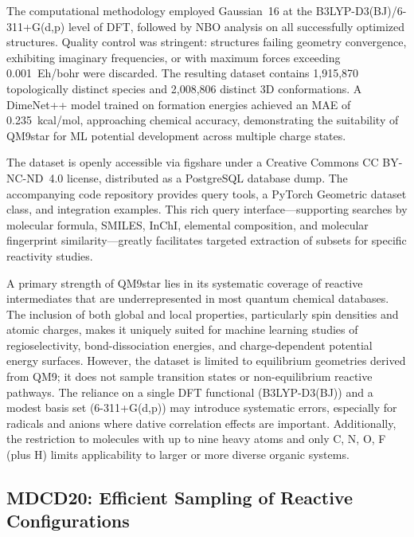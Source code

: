 \documentclass[12pt]{article}
\begin{document}
The computational methodology employed Gaussian~16 at the B3LYP-D3(BJ)/6-311+G(d,p) level of DFT, followed by NBO analysis on all successfully optimized structures. Quality control was stringent: structures failing geometry convergence, exhibiting imaginary frequencies, or with maximum forces exceeding 0.001~Eh/bohr were discarded. The resulting dataset contains 1,915,870 topologically distinct species and 2,008,806 distinct 3D conformations. A DimeNet++ model trained on formation energies achieved an MAE of 0.235~kcal/mol, approaching chemical accuracy, demonstrating the suitability of QM9star for ML potential development across multiple charge states.

The dataset is openly accessible via figshare under a Creative Commons CC BY-NC-ND~4.0 license, distributed as a PostgreSQL database dump. The accompanying code repository provides query tools, a PyTorch Geometric dataset class, and integration examples. This rich query interface---supporting searches by molecular formula, SMILES, InChI, elemental composition, and molecular fingerprint similarity---greatly facilitates targeted extraction of subsets for specific reactivity studies.

A primary strength of QM9star lies in its systematic coverage of reactive intermediates that are underrepresented in most quantum chemical databases. The inclusion of both global and local properties, particularly spin densities and atomic charges, makes it uniquely suited for machine learning studies of regioselectivity, bond-dissociation energies, and charge-dependent potential energy surfaces. However, the dataset is limited to equilibrium geometries derived from QM9; it does not sample transition states or non-equilibrium reactive pathways. The reliance on a single DFT functional (B3LYP-D3(BJ)) and a modest basis set (6-311+G(d,p)) may introduce systematic errors, especially for radicals and anions where dative correlation effects are important. Additionally, the restriction to molecules with up to nine heavy atoms and only C, N, O, F (plus H) limits applicability to larger or more diverse organic systems.

\subsection{MDCD20: Efficient Sampling of Reactive Configurations}
\end{document}
